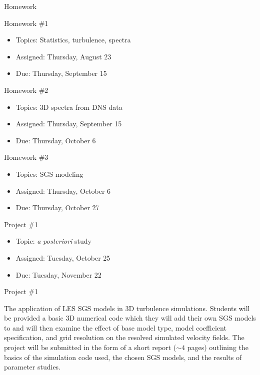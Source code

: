 \begin{frame}{Homework}

Homework \#1
\begin{itemize}
\item Topics: \tabto*{50pt} Statistics, turbulence, spectra
\item Assigned:\tabto*{50pt} Thursday, August 23
\item Due:\tabto*{50pt} Thursday, September 15
\end{itemize}

Homework \#2
\begin{itemize}
\item Topics: \tabto*{50pt} 3D spectra from DNS data
\item Assigned:\tabto*{50pt} Thursday, September 15
\item Due:\tabto*{50pt} Thursday, October 6
\end{itemize}

Homework \#3
\begin{itemize}
\item Topics: \tabto*{50pt} SGS modeling
\item Assigned:\tabto*{50pt} Thursday, October 6
\item Due:\tabto*{50pt} Thursday, October 27
\end{itemize}
\end{frame}


\begin{frame}{Project \#1}

\begin{itemize}
\item Topic:\tabto*{50pt} \textit{a posteriori} study
\item Assigned:\tabto*{50pt} Tuesday, October 25
\item Due:\tabto*{50pt} Tuesday, November 22
\end{itemize}
\end{frame}


\begin{frame}{Project \#1}

The application of LES SGS models in 3D turbulence simulations. Students will be provided a basic 3D numerical code which they will add their own SGS models to and will then examine the effect of base model type, model coefficient specification, and grid resolution on the resolved simulated velocity fields. The project will be submitted in the form of a short report ($\sim4$ pages) outlining the basics of the simulation code used, the chosen SGS models, and the results of parameter studies.

\end{frame}

